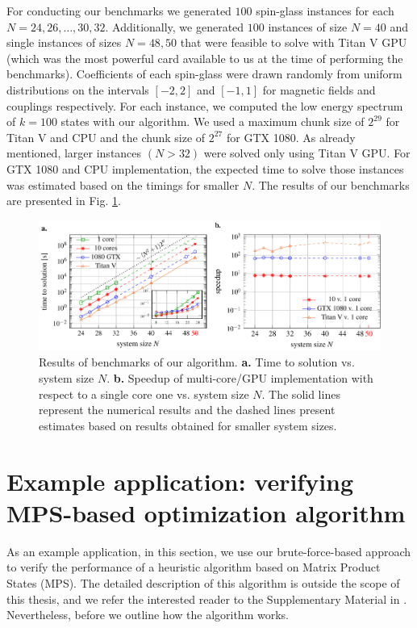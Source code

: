 For conducting our benchmarks we generated $100$ spin-glass instances for each
$N=24, 26, \ldots, 30, 32$. Additionally, we generated $100$ instances of size
$N=40$ and single instances of sizes $N=48, 50$ that were feasible to solve
with Titan V GPU (which was the most powerful card available to us at the time
of performing the benchmarks). Coefficients of each spin-glass were drawn
randomly from uniform distributions on the intervals $[-2, 2]$ and $[-1, 1]$
for magnetic fields and couplings respectively. For each instance, we computed
the low energy spectrum of $k=100$ states with our algorithm. We used a maximum
chunk size of $2^{29}$ for Titan V and CPU and the chunk size of $2^{27}$ for
    GTX 1080. As already mentioned, larger instances $(N > 32)$ were solved only
    using Titan V GPU. For GTX 1080 and CPU implementation, the expected time to
    solve those instances was estimated based on the timings for smaller $N$. The
results of our benchmarks are presented in Fig. \ref{fig:benchmark_results}.

\begin{figure}
  \centering
  \includegraphics[width=\textwidth]{figures/resultsplot_reduced.pdf}
  \caption{Results of benchmarks of our algorithm. {\textbf{a.}} Time to solution vs.
    system size $N$. {\textbf{b.}} Speedup of multi-core/GPU implementation with
    respect to a single core one vs. system size $N$. The solid lines represent the
    numerical results and the dashed lines present estimates based on results
    obtained for smaller system sizes.} \label{fig:benchmark_results}
\end{figure}

\section{Example application: verifying MPS-based optimization algorithm}

As an example application, in this section, we use our brute-force-based
approach to verify the performance of a heuristic algorithm based on Matrix
Product States (MPS). The detailed description of this algorithm is outside the
scope of this thesis, and we refer the interested reader to the Supplementary
Material in \cite{tn}. Nevertheless, before we outline how the algorithm works.

